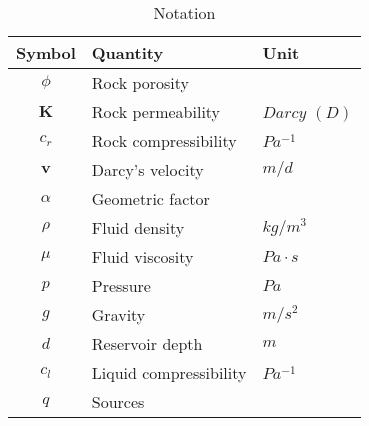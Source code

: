\documentclass[12pt]{article}
\numberwithin{equation}{section}
\begin{document}
\begin{table}[!h]
\centering
\begin{tabular}{c l l }
\hline
Symbol & Quantity & Unit \\[0.5ex]
\hline
$\phi$ & Rock porosity&   \\
 $\mathbf{K}$& Rock permeability&  $Darcy$ $(D)$ \\
 $c_r$& Rock compressibility&  $Pa^{-1}$ \\
$\mathbf{v}$ & Darcy's velocity& $ m/d$ \\
 $\alpha$& Geometric factor&   \\
$\rho$ &Fluid density &  $kg/m^3$ \\
 $\mu$&Fluid viscosity & $Pa \cdot s$   \\
${p}$  &Pressure &  $Pa$ \\
$g$  &Gravity &  $m/s^2$ \\
$d$ & Reservoir depth&  $m$ \\
$c_l$ &Liquid compressibility &  $Pa^{-1}$ \\
$q$ &Sources &   \\
\hline
\end{tabular}\label{table:symbols}
\caption{Notation}
\end{table}
\end{document}
